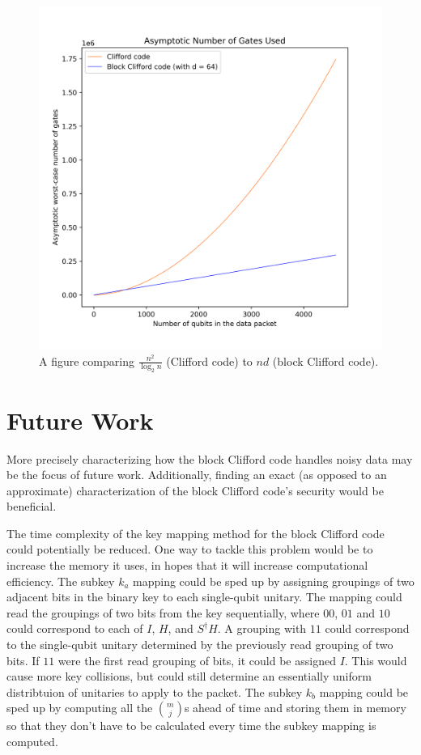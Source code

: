 \begin{figure}
    \centering
    \includegraphics[scale=0.6]{figures/number_of_gates.png}
    \caption{A figure comparing $\frac{n^2}{\log_2 n}$ (Clifford code) to $nd$ (block Clifford code).}
    \label{fig:numberOfGatesComparison}
\end{figure}

\section{Future Work}
More precisely characterizing how the block Clifford code handles noisy data may be the focus of future work. Additionally, finding an exact (as opposed to an approximate) characterization of the block Clifford code's security would be beneficial. 

The time complexity of the key mapping method for the block Clifford code could potentially be reduced. One way to tackle this problem would be to increase the memory it uses, in hopes that it will increase computational efficiency. The subkey $k_a$ mapping could be sped up by assigning groupings of two adjacent bits in the binary key to each single-qubit unitary. The mapping could read the groupings of two bits from the key sequentially, where $00$, $01$ and $10$ could correspond to each of $I$, $H$, and $S^{\dagger}H$. A grouping with $11$ could correspond to the single-qubit unitary determined by the previously read grouping of two bits. If $11$ were the first read grouping of bits, it could be assigned $I$. This would cause more key collisions, but could still determine an essentially uniform distribtuion of unitaries to apply to the packet. The subkey $k_b$ mapping could be sped up by computing all the ${m \choose j}$s ahead of time and storing them in memory so that they don't have to be calculated every time the subkey mapping is computed. 

